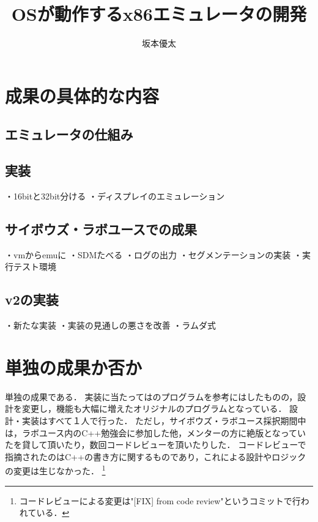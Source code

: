 \documentclass[10pt,a4j]{jsarticle}
\title{\vspace{-4cm}OSが動作するx86エミュレータの開発}
\author{坂本優太}
\date{}
\begin{document}
\maketitle

\renewcommand{\abstractname}{背景}
\begin{abstract}
\end{abstract}

\section{成果の具体的な内容}
\subsection{エミュレータの仕組み}
\subsection{実装}
・16bitと32bit分ける
・ディスプレイのエミュレーション

\subsection{サイボウズ・ラボユースでの成果}
・vmからemuに
・SDMたべる
・ログの出力
・セグメンテーションの実装
・実行テスト環境
\subsection{v2の実装}
・新たな実装
・実装の見通しの悪さを改善
・ラムダ式

\section{単独の成果か否か}
単独の成果である．
実装に当たっては\cite{learn-x86-by-emu}のプログラムを参考にはしたものの，設計を変更し，機能も大幅に増えたオリジナルのプログラムとなっている．
設計・実装はすべて１人で行った．
ただし，サイボウズ・ラボユース採択期間中は，ラボユース内のC++勉強会に参加した他，メンターの方に絶版となっていた\cite{read-486}を貸して頂いたり，数回コードレビューを頂いたりした．
コードレビューで指摘されたのはC++の書き方に関するものであり，これによる設計やロジックの変更は生じなかった．
\footnote{コードレビューによる変更は"[FIX] from code review"というコミットで行われている．}
\end{document}
